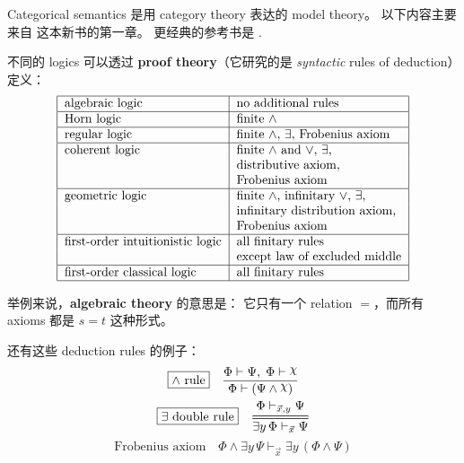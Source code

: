 \documentclass[12pt, orivec]{article}
\newcommand{\Chi}{\raisebox{2.5pt}{$\chi$}}
\newcommand{\Dfrac}[2]{%
\ooalign{%
      $\genfrac{}{}{2.9pt}0{\hphantom{#1}}{\hphantom{#2}}$\cr%
      $\color{white}\genfrac{}{}{1.5pt}0{\hphantom{#1}}{\hphantom{#2}}$\cr%
      $\color{white}\genfrac{}{}{1pt}0{\color{black}#1}{\color{black}#2}$}}
\begin{document}
Categorical semantics 是用 category theory 表达的 model theory。  以下内容主要来自 \parencite{Caramello2018} 这本新书的第一章。  更经典的参考书是 \parencite{Goldblatt2006}. 

不同的 logics 可以透过 \textbf{proof theory}（它研究的是 \textit{syntactic} rules of deduction）定义：
\begin{equation}
\begin{tabular}{|l|l|}
\hline
algebraic logic & no additional rules\\
\hline
Horn logic & finite $\wedge$ \\
\hline
regular logic & finite $\wedge$, $\exists$, Frobenius axiom\\
\hline
coherent logic & finite $\wedge$ and $\vee$, $\exists$,\\
				& distributive axiom, \\
				& Frobenius axiom \\
\hline
geometric logic & finite $\wedge$, infinitary $\vee$, $\exists$,\\
				& infinitary distribution axiom,\\
				& Frobenius axiom \\
\hline
first-order intuitionistic logic & all finitary rules \\
				& except law of excluded middle\\
\hline
first-order classical logic & all finitary rules \\
\hline
\end{tabular}
\end{equation}

举例来说，\textbf{algebraic theory} 的意思是： 它只有一个 relation $=$，而所有 axioms 都是 $s = t$ 这种形式。 

还有这些 deduction rules 的例子：
\begin{equation}
\boxed{\wedge \mbox{ rule}}	\quad \frac{\Phi \vdash \Psi, \; \Phi \vdash \Chi}{\Phi \vdash (\Psi \wedge \Chi)}
\end{equation}
\vspace*{-5pt}
\begin{equation}
\boxed{\exists \mbox{ double rule}}	\quad \Dfrac{\Phi \vdash_{\vec{x}, y} \Psi}{\exists y \, \Phi \vdash_{\vec{x}} \Psi}
\end{equation}
\begin{equation}
\boxed{\mbox{Frobenius axiom}}	\quad \Phi \wedge \exists y \, \Psi \vdash_{\vec{x}} \exists y \, (\Phi \wedge \Psi)
\end{equation}
\end{document}
